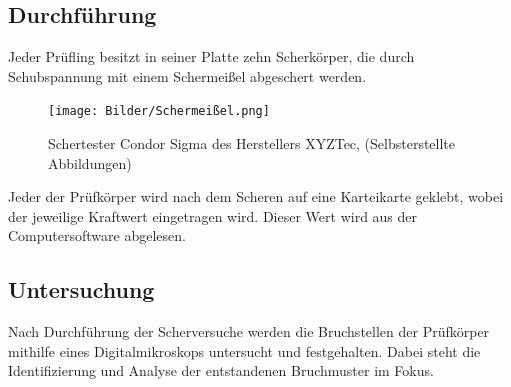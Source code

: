 \subsection{Durchführung}
Jeder Prüfling besitzt in seiner Platte zehn Scherkörper, die durch Schubspannung mit einem Schermeißel abgeschert werden.
\vspace{0.1cm}
\begin{figure}[h]
    \centering
    \texttt{[image: Bilder/Schermeißel.png]}
    \caption{Schertester Condor Sigma des Herstellers XYZTec, (Selbsterstellte Abbildungen)}
    \vspace{0.2cm}
    \label{Abb.4: Schertester Condor Sigma des Herstellers XYZTec}
\end{figure}
\vspace{0.1cm}
Jeder der Prüfkörper wird nach dem Scheren auf eine Karteikarte geklebt, wobei der jeweilige Kraftwert eingetragen wird.
Dieser Wert wird aus der Computersoftware abgelesen.
\subsection{Untersuchung}
Nach Durchführung der Scherversuche werden die Bruchstellen der Prüfkörper mithilfe eines Digitalmikroskops untersucht und festgehalten.
Dabei steht die Identifizierung und Analyse der entstandenen Bruchmuster im Fokus. 